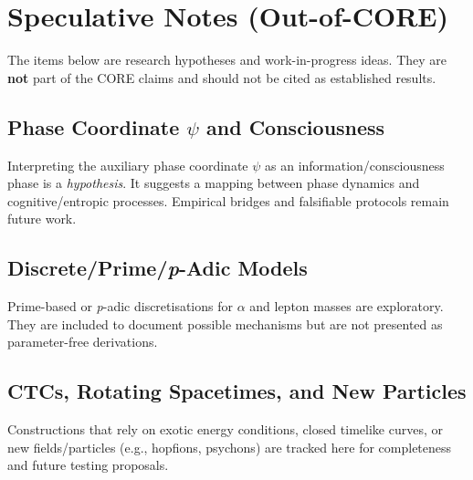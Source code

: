\section{Speculative Notes (Out-of-CORE)}
The items below are research hypotheses and work-in-progress ideas. They are \textbf{not} part of the CORE claims and should not be cited as established results.

\subsection{Phase Coordinate $\psi$ and Consciousness}
Interpreting the auxiliary phase coordinate $\psi$ as an information/consciousness phase is a \emph{hypothesis}. It suggests a mapping between phase dynamics and cognitive/entropic processes. Empirical bridges and falsifiable protocols remain future work.

\subsection{Discrete/Prime/\emph{p}-Adic Models}
Prime-based or \emph{p}-adic discretisations for $\alpha$ and lepton masses are exploratory. They are included to document possible mechanisms but are not presented as parameter-free derivations.

\subsection{CTCs, Rotating Spacetimes, and New Particles}
Constructions that rely on exotic energy conditions, closed timelike curves, or new fields/particles (e.g., hopfions, psychons) are tracked here for completeness and future testing proposals.
